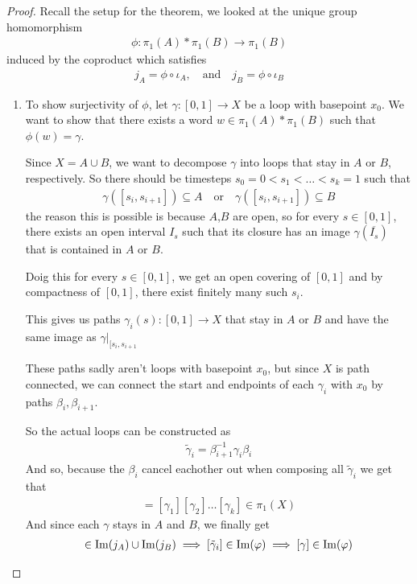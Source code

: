 \begin{proof}
Recall the setup for the theorem, we looked at the unique group homomorphism
\begin{align*}
  \phi: \pi_1(A) \ast \pi_1(B) \to  \pi_1(B)
\end{align*}
induced by the coproduct which satisfies
\begin{align*}
  j_A = \phi \circ \iota_A,\quad \text{and} \quad j_B = \phi \circ \iota_B
\end{align*}
\begin{enumerate}
  \item To show surjectivity of $\phi$, let $\gamma:[0,1]\to X$ be a loop with basepoint $x_0$.
    We want to show that there exists a word $w \in \pi_1(A) \ast \pi_1(B)$ such that $\phi(w) = \gamma$.

    Since $X = A \cup B$, we want to decompose $\gamma$ into loops that stay in $A$ or $B$, respectively.
    So there should be timesteps $s_0 = 0 < s_1 < \ldots < s_k = 1$ such that
    \begin{align*}
      \gamma([s_i,s_{i+1}]) \subseteq A 
      \quad \text{or} \quad 
      \gamma([s_i,s_{i+1}]) \subseteq B
    \end{align*}
    the reason this is possible is because $A$,$B$ are open, so for every $s \in [0,1]$, there exists an open interval $I_s$ such that its closure has an image $\gamma(\overline{I_s})$ that is contained in $A$ or $B$.

    Doig this for every $s \in [0,1]$, we get an open covering of $[0,1]$ and by compactness of $[0,1]$, there exist finitely many such $s_i$.

    This gives us paths $\gamma_i(s): [0,1] \to X$ that stay in $A$ or $B$ and have the same image as $\gamma|_{[s_i,s_{i+1}}$

    These paths sadly aren't loops with basepoint $x_0$, but since $X$ is path connected, we can connect the start and endpoints of each $\gamma_i$ with $x_0$ by paths $\beta_i, \beta_{i+1}$.

    So the actual loops can be constructed as
    \begin{align*}
      \tilde{\gamma}_i = \beta_{i+1}^{-1} \gamma_i \beta_i
    \end{align*}
    And so, because the $\beta_i$ cancel eachother out when composing all $\tilde{\gamma}_i$ we get that
    \begin{align*}
      [\gamma] = [\gamma_1][\gamma_2] \dots [\gamma_k] \in \pi_1(X)
    \end{align*}
    And since each $\gamma$ stays in $A$ and $B$, we finally get
    \begin{align*}
      [\tilde{\gamma}_i] \in \Image(j_A) \cup \Image(j_B) \implies [\tilde{\gamma}_i] \in \Image(\phi) \implies [\gamma] \in \Image(\phi)
    \end{align*}


\end{enumerate}
\end{proof}
